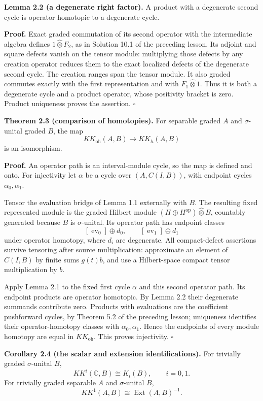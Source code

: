 \documentclass[
  11pt,
]{article}
\begin{document}
\textbf{Lemma 2.2 (a degenerate right factor).} A product with a
degenerate second cycle is operator homotopic to a degenerate cycle.

\textbf{Proof.} Exact graded commutation of its second operator with the
intermediate algebra defines \(1\widehat\otimes F_2\), as in Solution
10.1 of the preceding lesson. Its adjoint and square defects vanish on
the tensor module: multiplying those defects by any creation operator
reduces them to the exact localized defects of the degenerate second
cycle. The creation ranges span the tensor module. It also graded
commutes exactly with the first representation and with
\(F_1\widehat\otimes1\). Thus it is both a degenerate cycle and a
product operator, whose positivity bracket is zero. Product uniqueness
proves the assertion. \(\square\)

\textbf{Theorem 2.3 (comparison of homotopies).} For separable graded
\(A\) and \(\sigma\)-unital graded \(B\), the map \[
KK_{\mathrm{oh}}(A,B)\longrightarrow KK_h(A,B)
\tag{2.2}
\] is an isomorphism.

\textbf{Proof.} An operator path is an interval-module cycle, so the map
is defined and onto. For injectivity let \(\alpha\) be a cycle over
\((A,C(I,B))\), with endpoint cycles \(\alpha_0,\alpha_1\).

Tensor the evaluation bridge of Lemma 1.1 externally with \(B\). The
resulting fixed represented module is the graded Hilbert module
\((H\oplus H^{\mathrm{op}})\widehat\otimes B\), countably generated
because \(B\) is \(\sigma\)-unital. Its operator path has endpoint
classes \[
[\operatorname{ev}_0]\oplus d_0,\qquad
[\operatorname{ev}_1]\oplus d_1
\] under operator homotopy, where \(d_i\) are degenerate. All
compact-defect assertions survive tensoring after source multiplication:
approximate an element of \(C(I,B)\) by finite sums \(g(t)b\), and use a
Hilbert-space compact tensor multiplication by \(b\).

Apply Lemma 2.1 to the fixed first cycle \(\alpha\) and this second
operator path. Its endpoint products are operator homotopic. By Lemma
2.2 their degenerate summands contribute zero. Products with evaluations
are the coefficient pushforward cycles, by Theorem 5.2 of the preceding
lesson; uniqueness identifies their operator-homotopy classes with
\(\alpha_0,\alpha_1\). Hence the endpoints of every module homotopy are
equal in \(KK_{\mathrm{oh}}\). This proves injectivity. \(\square\)

\textbf{Corollary 2.4 (the scalar and extension identifications).} For
trivially graded \(\sigma\)-unital \(B\), \[
KK^i(\mathbb C,B)\cong K_i(B),\qquad i=0,1.
\tag{2.3}
\] For trivially graded separable \(A\) and \(\sigma\)-unital \(B\), \[
KK^1(A,B)\cong\operatorname{Ext}(A,B)^{-1}.
\tag{2.4}
\]
\end{document}
